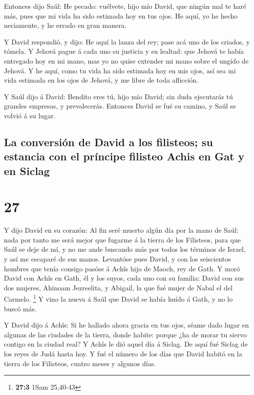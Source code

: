  Entonces dijo Saúl: He pecado: vuélvete, hijo mío David,
que ningún mal te haré más, pues que mi vida ha sido estimada hoy en tus
ojos. He aquí, yo he hecho neciamente, y he errado en gran manera.

 Y David respondió, y dijo: He aquí la lanza del rey; pase
acá uno de los criados, y tómela.  Y Jehová pague á cada
uno su justicia y su lealtad: que Jehová te había entregado hoy en mi
mano, mas yo no quise extender mi mano sobre el ungido de Jehová.
 Y he aquí, como tu vida ha sido estimada hoy en mis ojos,
así sea mi vida estimada en los ojos de Jehová, y me libre de toda
aflicción.

 Y Saúl dijo á David: Bendito eres tú, hijo mío David; sin
duda ejecutarás tú grandes empresas, y prevalecerás. Entonces David se
fué su camino, y Saúl se volvió á su lugar.

\hypertarget{la-conversiuxf3n-de-david-a-los-filisteos-su-estancia-con-el-pruxedncipe-filisteo-achis-en-gat-y-en-siclag}{%
\subsection{La conversión de David a los filisteos; su estancia con el
príncipe filisteo Achis en Gat y en
Siclag}\label{la-conversiuxf3n-de-david-a-los-filisteos-su-estancia-con-el-pruxedncipe-filisteo-achis-en-gat-y-en-siclag}}

\hypertarget{section-26}{%
\section{27}\label{section-26}}

 Y dijo David en su corazón: Al fin seré muerto algún día
por la mano de Saúl: nada por tanto me será mejor que fugarme á la
tierra de los Filisteos, para que Saúl se deje de mí, y no me ande
buscando más por todos los términos de Israel, y así me escaparé de sus
manos.  Levantóse pues David, y con los seiscientos hombres
que tenía consigo pasóse á Achîs hijo de Maoch, rey de Gath.
 Y moró David con Achîs en Gath, él y los suyos, cada uno
con su familia: David con sus dos mujeres, Ahinoam Jezreelita, y
Abigail, la que fué mujer de Nabal el del Carmelo. \footnote{\textbf{27:3}
  1Sam 25,40-43}  Y vino la nueva á Saúl que David se había
huído á Gath, y no lo buscó más.

 Y David dijo á Achîs: Si he hallado ahora gracia en tus
ojos, séame dado lugar en algunas de las ciudades de la tierra, donde
habite: porque ¿ha de morar tu siervo contigo en la ciudad real?
 Y Achîs le dió aquel día á Siclag. De aquí fué Siclag de
los reyes de Judá hasta hoy.  Y fué el número de los días
que David habitó en la tierra de los Filisteos, cuatro meses y algunos
días.

